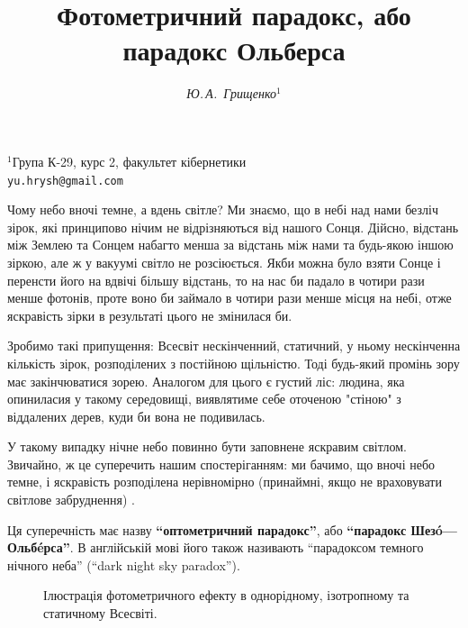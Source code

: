 \documentclass[a4paper]{article}
\begin{document}
\title{Фотометричний парадокс, або парадокс Ольберса}
\author{\textsl{Ю.\,А.~Грищенко$^{1}$}}
\date{\vspace*{-6ex}}
\maketitle
\begin{center} 
{\small $^{1}$Група К-29, курс 2, факультет кібернетики\\
{\tt yu.hrysh@gmail.com}}
\end{center}

Чому небо вночі темне, а вдень світле? Ми знаємо, що в небі над нами безліч зірок, які принципово нічим не відрізняються від нашого Сонця. Дійсно, відстань між Землею та Сонцем набагто менша за відстань між нами та будь-якою іншою зіркою, але ж у вакуумі світло не розсіюється. Якби можна було взяти Сонце і перенсти його на вдвічі більшу відстань, то на нас би падало в чотири рази менше фотонів, проте воно би займало в чотири рази менше місця на небі, отже яскравість зірки в результаті цього не змінилася би. \cite{relativityFAQ}

Зробимо такі припущення: Всесвіт нескінченний, статичний, у ньому нескінченна кількість зірок, розподілених з постійною щільністю. Тоді будь-який промінь зору має закінчюватися зорею. Аналогом для цього є густий ліс: людина, яка опиниласия у такому середовищі, виявлятиме себе оточеною "стіною" з віддалених дерев, куди би вона не подивилась.

У такому випадку нічне небо повинно бути заповнене яскравим світлом. Звичайно, ж це суперечить нашим спостеріганням: ми бачимо, що вночі небо темне, і яскравість розподілена нерівномірно (принаймні, якщо не враховувати світлове забруднення) \cite{nyt}.

Ця суперечність має назву \textbf{``оптометричний парадокс''}, або \textbf{``парадокс Шез\'o—Ольб\'eрса''}. В англійській мові його також називають ``парадоксом темного нічного неба'' (``dark night sky paradox''). \cite{dictionary}

\begin{figure}[ht]
\caption{Ілюстрація фотометричного ефекту в однорідному, ізотропному та статичному Всесвіті.}
\label{olbersIllust}
\end{figure}
\end{document}
